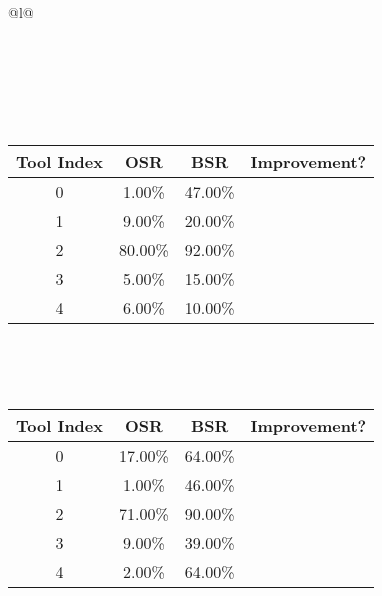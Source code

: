 \begin{longtable}{@{}l@{}}
\caption{Tool selection results for llama3.2:3b on ollama with attacker llama3.2:3b and defense none. \\ \textbf{Overall Improvement: 88.00\%}} \\
\toprule
{} \\
\midrule
\endfirsthead
\toprule
{} \\
\midrule
\endhead
\bottomrule
\endfoot
\begin{minipage}{\textwidth}
\centering{}\\[0.8ex]
\begin{tabular}{|c|c|c|c|} \hline
\textbf{Tool Index} & \textbf{OSR} & \textbf{ BSR} & \textbf{Improvement?} \\ \hline
0 & 1.00\% & 47.00\% & \textcolor{green}{\ding{51}} \\ \hline
1 & 9.00\% & 20.00\% & \textcolor{green}{\ding{51}} \\ \hline
2 & 80.00\% & 92.00\% & \textcolor{green}{\ding{51}} \\ \hline
3 & 5.00\% & 15.00\% & \textcolor{green}{\ding{51}} \\ \hline
4 & 6.00\% & 10.00\% & \textcolor{green}{\ding{51}} \\ \hline
\end{tabular}
\end{minipage}\\[2ex]
\begin{minipage}{\textwidth}
\centering\vspace{2ex}
\\[0.8ex]
\begin{tabular}{|c|c|c|c|} \hline
\textbf{Tool Index} & \textbf{OSR} & \textbf{ BSR} & \textbf{Improvement?} \\ \hline
0 & 17.00\% & 64.00\% & \textcolor{green}{\ding{51}} \\ \hline
1 & 1.00\% & 46.00\% & \textcolor{green}{\ding{51}} \\ \hline
2 & 71.00\% & 90.00\% & \textcolor{green}{\ding{51}} \\ \hline
3 & 9.00\% & 39.00\% & \textcolor{green}{\ding{51}} \\ \hline
4 & 2.00\% & 64.00\% & \textcolor{green}{\ding{51}} \\ \hline

\end{tabular}
\end{minipage}
\end{longtable}
